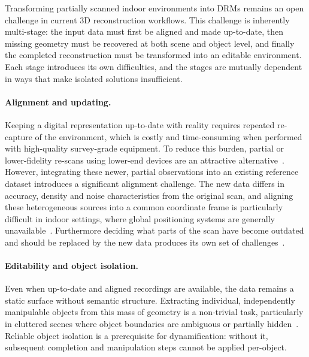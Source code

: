 Transforming partially scanned indoor environments into \gls{DRM}s remains an open challenge in current 3D reconstruction workflows. This challenge is inherently multi-stage: the input data must first be aligned and made up-to-date, then missing geometry must be recovered at both scene and object level, and finally the completed reconstruction must be transformed into an editable environment. Each stage introduces its own difficulties, and the stages are mutually dependent in ways that make isolated solutions insufficient.
 
\paragraph{Alignment and updating.}
Keeping a digital representation up-to-date with reality requires repeated re-capture of the environment, which is costly and time-consuming when performed with high-quality survey-grade equipment. To reduce this burden, partial or lower-fidelity re-scans using lower-end devices are an attractive alternative~\cite{geyter_point_2022}. However, integrating these newer, partial observations into an existing reference dataset introduces a significant alignment challenge. The new data differs in accuracy, density and noise characteristics from the original scan, and aligning these heterogeneous sources into a common coordinate frame is particularly difficult in indoor settings, where global positioning systems are generally unavailable~\cite{vermandere_two-step_2022}. Furthermore deciding what parts of the scan have become outdated and should be replaced by the new data produces its own set of challenges~\cite{vermandere_automatic_2022, bassier_geomapi_2024}.

\paragraph{Editability and object isolation.}
Even when up-to-date and aligned recordings are available, the data remains a static surface without semantic structure. Extracting individual, independently manipulable objects from this mass of geometry is a non-trivial task, particularly in cluttered scenes where object boundaries are ambiguous or partially hidden~\cite{vermandere_guided_2025}. Reliable object isolation is a prerequisite for dynamification: without it, subsequent completion and manipulation steps cannot be applied per-object.

